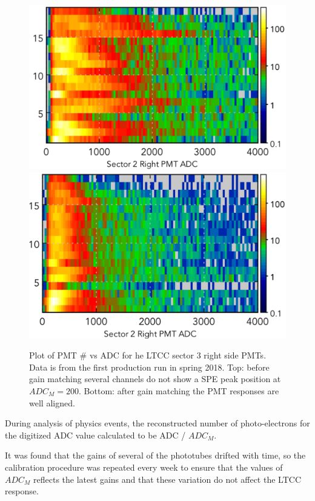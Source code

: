 \begin{figure}[h]
	\centering
	\includegraphics[width=0.99\columnwidth,keepaspectratio]{img/gainMatchingBefore.png}
	\includegraphics[width=0.99\columnwidth,keepaspectratio]{img/gainMatchingAfter.png}
	\caption{Plot of PMT \# vs ADC for he LTCC sector 3 right side PMTs. Data is from the first production
             run in spring 2018. Top: before gain matching several channels do not show a SPE peak position at  $ADC_M = 200$.
             Bottom: after gain matching the PMT responses are well aligned.}
	\label{fig:gainMatching}
\end{figure}

During analysis of physics events, the reconstructed number of photo-electrons for the digitized ADC value calculated to be ADC / $ADC_M$.

It was found that the gains of several of the phototubes drifted with time, so the calibration procedure was repeated every week to ensure that
the values of $ADC_M$ reflects the latest gains and that these variation do not affect the LTCC response.



